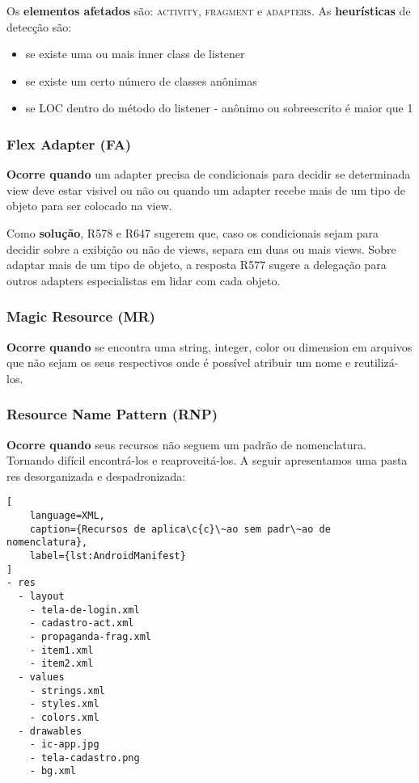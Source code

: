 Os \textbf{elementos afetados} s\~ao: \textsc{activity}, \textsc{fragment} e \textsc{adapters}. As \textbf{heur\'isticas} de detec\c{c}\~ao s\~ao:

\begin{itemize} 
	\item[$\circ$] [n\'ivel 4] se existe uma ou mais inner class de listener
	\item[$\circ$] [n\'ivel 3] se existe um certo n\'umero de classes an\^onimas
	\item[$\circ$] [n\'ivel 2 e 3] se LOC dentro do m\'etodo do listener - an\^onimo ou sobreescrito \'e maior que 1
\end{itemize}


\subsubsection{Flex Adapter (FA)}

\textbf{Ocorre quando} um adapter precisa de condicionais para decidir se determinada view deve estar visivel ou n\~ao ou quando um adapter recebe mais de um tipo de objeto para ser colocado na view.

Como \textbf{solu\c{c}\~ao}, R578 e R647 sugerem que, caso os condicionais sejam para decidir sobre a exibi\c{c}\~ao ou n\~ao de views, separa em duas ou mais views. Sobre adaptar mais de um tipo de objeto, a resposta R577 sugere a delega\c{c}\~ao para outros adapters especialistas em lidar com cada objeto.


\subsubsection{Magic Resource (MR)}

\textbf{Ocorre quando} se encontra uma string, integer, color ou dimension em arquivos que n\~ao sejam os seus respectivos onde \'e poss\'ivel atribuir um nome e reutiliz\'a-los. 


\subsubsection{Resource Name Pattern (RNP)}

\textbf{Ocorre quando} seus recursos n\~ao seguem um padr\~ao de nomenclatura. Tornando dif\'icil encontr\'a-los e reaproveit\'a-los. A seguir apresentamos uma pasta res desorganizada e despadronizada:

\begin{lstlisting}[
	language=XML, 
	caption={Recursos de aplica\c{c}\~ao sem padr\~ao de nomenclatura}, 
	label={lst:AndroidManifest}
]
- res
  - layout
    - tela-de-login.xml
    - cadastro-act.xml
    - propaganda-frag.xml
    - item1.xml
    - item2.xml
  - values
    - strings.xml 
    - styles.xml
    - colors.xml
  - drawables
    - ic-app.jpg
    - tela-cadastro.png
    - bg.xml
\end{lstlisting}

